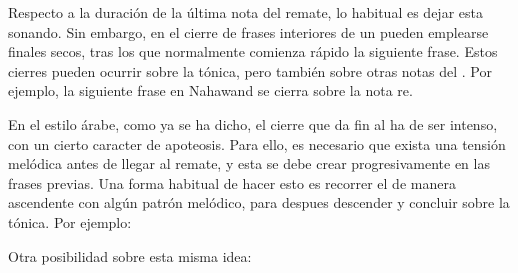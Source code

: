 Respecto a la duración de la última nota del remate, lo habitual es dejar esta sonando. Sin embargo, en el cierre de frases interiores de un \taqsim pueden emplearse finales secos, tras los que normalmente comienza rápido la siguiente frase. Estos cierres pueden ocurrir sobre la tónica, pero también sobre otras notas del \maqamb. Por ejemplo, la siguiente frase en \maqam Nahawand se cierra sobre la nota re.


\begin{center}
\end{center}



En el estilo árabe, como ya se ha dicho, el cierre que da fin al \taqsim ha de ser intenso, con un cierto caracter de apoteosis. Para ello, es necesario que exista una tensión melódica antes de llegar al remate, y esta se debe crear progresivamente en las frases previas. Una forma habitual de hacer esto es recorrer el \maqam de manera ascendente con algún patrón melódico, para despues descender y concluir sobre la tónica. Por ejemplo:


\begin{center}
\end{center}



Otra posibilidad sobre esta misma idea:


\begin{center}
\end{center}

